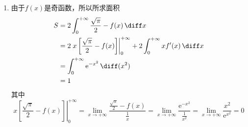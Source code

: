 \begin{solution}
\begin{enumerate}[(1)]
        \item 由于$f(x)$是奇函数，所以所求面积
              \begin{align*}
                  S
                   & = 2\int_0^{+\infty} \frac{\sqrt{\pi}}{2} - f(x)\,\diff x                                                  \\
                   & = 2\left.x\left[\frac{\sqrt{\pi}}{2} - f(x)\right]\right|_0^{+\infty} + 2\int_0^{+\infty} xf'(x)\,\diff x \\
                   & = \int_0^{+\infty} \mathrm{e}^{-x^2}\,\diff (x^2)                                                         \\
                   & = 1
              \end{align*}
              其中
              \[
                  \left.x\left[\frac{\sqrt{\pi}}{2} - f(x)\right]\right|_0^{+\infty}
                  =
                  \lim_{x\to+\infty} \frac{\frac{\sqrt{\pi}}{2} - f(x)}{\frac{1}{x}}
                  =
                  \lim_{x\to+\infty} \frac{\mathrm{e}^{-x^2}}{\frac{1}{x^2}}
                  =
                  \lim_{x\to+\infty} \frac{x^2}{\mathrm{e}^{x^2}}
                  =
                  0
              \]
    \end{enumerate}
\end{solution}
